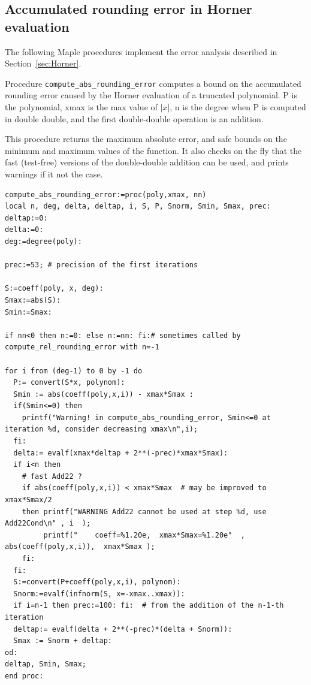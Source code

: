 \subsection{Accumulated rounding error in Horner evaluation
 \label{sec:Horner-maple}}



The following Maple procedures implement the error analysis described
in Section~\ref{sec:Horner}.

Procedure \texttt{compute\_abs\_rounding\_error} computes a bound on
the accumulated rounding error caused by the Horner evaluation of a
truncated polynomial. P is the polynomial, xmax is the max value of
$|x|$, n is the degree when P is computed in double double, and the
first double-double operation is an addition.

This procedure returns the maximum absolute error, and safe bounds on the
minimum and maximum values of the function. It also checks on the fly
that the fast (test-free) versions of the double-double addition can
be used, and prints warnings if it not the case.

\begin{lstlisting}[caption={compute\_abs\_rounding\_error},firstnumber=1]
compute_abs_rounding_error:=proc(poly,xmax, nn)
local n, deg, delta, deltap, i, S, P, Snorm, Smin, Smax, prec:
deltap:=0:
delta:=0:
deg:=degree(poly):

prec:=53; # precision of the first iterations

S:=coeff(poly, x, deg):
Smax:=abs(S):
Smin:=Smax:

if nn<0 then n:=0: else n:=nn: fi:# sometimes called by compute_rel_rounding_error with n=-1

for i from (deg-1) to 0 by -1 do
  P:= convert(S*x, polynom):
  Smin := abs(coeff(poly,x,i)) - xmax*Smax : 
  if(Smin<=0) then 
    printf("Warning! in compute_abs_rounding_error, Smin<=0 at iteration %d, consider decreasing xmax\n",i);
  fi:
  delta:= evalf(xmax*deltap + 2**(-prec)*xmax*Smax):
  if i<n then 
    # fast Add22 ?    
    if abs(coeff(poly,x,i)) < xmax*Smax  # may be improved to xmax*Smax/2
    then printf("WARNING Add22 cannot be used at step %d, use Add22Cond\n" , i  );   
         printf("    coeff=%1.20e,  xmax*Smax=%1.20e"  ,  abs(coeff(poly,x,i)),  xmax*Smax );
    fi:
  fi:
  S:=convert(P+coeff(poly,x,i), polynom):
  Snorm:=evalf(infnorm(S, x=-xmax..xmax)):
  if i=n-1 then prec:=100: fi:  # from the addition of the n-1-th iteration
  deltap:= evalf(delta + 2**(-prec)*(delta + Snorm)): 
  Smax := Snorm + deltap:  
od:
deltap, Smin, Smax;
end proc:
\end{lstlisting}
\vspace{0.5cm}


